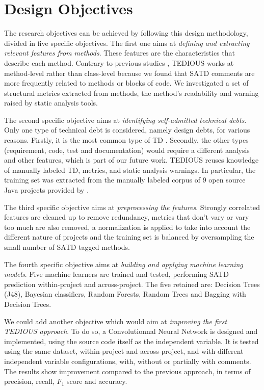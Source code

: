 \section{Design Objectives} 

The research objectives can be achieved by following this design methodology, divided in five specific objectives. The first one aims at \emph{defining and extracting relevant features from methods}. These features are the characteristics that describe each method. Contrary to previous studies \citep{BavotaR16}, \ac{TEDIOUS} works at method-level rather than class-level because we found that \ac{SATD} comments are more frequently related to methods or blocks of code. We investigated a set of structural metrics extracted from methods, the method's readability and warning raised by static analysis tools. \par

The second specific objective aims at \emph{identifying self-admitted technical debts}. Only one type of technical debt is considered, namely design debts, for various reasons. Firstly, it is the most common type of \ac{TD} \citep{MaldonadoNLP}. Secondly, the other types (requirement, code, test and documentation) would require a different analysis and other features, which is part of our future work. TEDIOUS reuses knowledge of manually labeled TD, metrics, and static analysis warnings. In particular, the training set was extracted from the manually labeled corpus of 9 open source Java projects provided by \citet{MaldonadoNLP}.

The third specific objective aims at \emph{preprocessing the features}. Strongly correlated features are cleaned up to remove redundancy, metrics that don't vary or vary too much are also removed, a normalization is applied to take into account the different nature of projects and the training set is balanced by oversampling the small number of \ac{SATD} tagged methods. \par

The fourth specific objective aims at \emph{building and applying machine learning models}. Five machine learners are trained and tested, performing \ac{SATD} prediction within-project and across-project. The five retained are: Decision Trees (J48), Bayesian classifiers, Random Forests, Random Trees and Bagging with Decision Trees. \par

We could add another objective which would aim at \emph{improving the first \ac{TEDIOUS} approach}. To do so, a Convolutionnal Neural Network is designed and implemented, using the source code itself as the independent variable. It is tested using the same dataset, within-project and across-project, and with different independent variable configurations, with, without or partially with comments. The results show improvement compared to the previous approach, in terms of precision, recall, $F_1$ score and accuracy.

